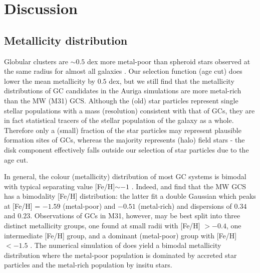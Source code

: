 \documentclass[a4paper,fleqn,usenatbib]{mnras}
\begin{document}
\section{Discussion}

\label{sec:discussion}
\subsection{Metallicity distribution}
\label{sec:discussion_FeH}
Globular clusters are ${\sim}0.5$ dex more metal-poor than spheroid stars observed 
at the same radius for almost all galaxies \citep{1991ARA&A..29..543H}. Our 
selection function (age cut) does lower the mean metallicity by $0.5$ dex, but
we still find that the metallicity distributions of GC candidates in the Auriga
simulations are more metal-rich than the MW (M31) GCS. Although the (old) star
particles represent single stellar populations with a mass (resolution) consistent 
with that of GCs, they are in fact statistical tracers of the stellar population 
of the galaxy as a whole. Therefore only a (small) fraction of the star particles 
may represent plausible formation sites of GCs, whereas the majority represents 
(halo) field stars - the disk component effectively falls outside our selection 
of star particles due to the age cut. 

In general, the colour (metallicity) distribution of most GC systems is bimodal 
with typical separating value [Fe/H]$\sim -1$ \citep{1985ApJ...293..424Z,
1999AJ....118.1526G,2001AJ....121.2974L,2006ApJ...639...95P}. Indeed, 
\citet[][p. 234]{1998gcs..book.....A} and \citet[][p. 38]{Harris2001} find that
the MW GCS has a bimodality [Fe/H] distribution: the latter fit a double Gaussian 
which peaks at [Fe/H] = $-1.59$ (metal-poor) and $-0.51$ (metal-rich) and 
dispersions of $0.34$ and $0.23$. Observations of GCs in M31, however, may be
best split into three distinct metallicity groups, one found at small radii with 
[Fe/H] $>-0.4$, one intermediate [Fe/H] group, and a dominant (metal-poor) group 
with [Fe/H] $< -1.5$ \citep{2016ApJ...824...42C}. The numerical simulation of
\citet{2017MNRAS.465.3622R} does yield a bimodal metallicity distribution where
the metal-poor population is dominated by accreted star particles and the metal-rich
population by insitu stars. 
\end{document}

